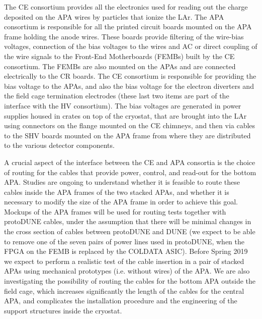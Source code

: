The CE consortium provides all the electronics used for reading out the charge
deposited on the APA wires by particles that ionize the LAr. The APA consortium
is responsible for all the printed circuit boards mounted on the APA frame
holding the anode wires. These boards provide filtering of the wire-bias voltages,
connection of the bias voltages to the wires and AC or direct coupling of the
wire signals to the Front-End Motherboards (FEMBs) built by the CE consortium.
The FEMBs are also mounted on the APAs and are connected electrically to the
CR boards. The CE consortium is responsible for providing the bias voltage to
the APAs, and also the bias voltage for the electron diverters and the field
cage termination electrodes (these last two items are part of the interface with
the HV consortium). The bias voltages are generated in power supplies housed
in crates on top of the cryostat, that are brought into the LAr using connectors
on the flange mounted on the CE chimneys, and then via cables to the SHV boards
mounted on the APA frame from where they are distributed to the various detector
components.

A crucial aspect of the interface between the CE and APA consortia
is the choice of routing for the cables that provide power, control, and read-out
for the bottom APA. Studies are ongoing to understand whether it is feasible to
route these cables inside the APA frames of the two stacked APAs, and whether it
is necessary to modify the size of the APA frame in order to achieve this goal.
Mockups of the APA frames will be used for routing tests together with protoDUNE
cables, under the assumption that there will be minimal changes in the cross
section of cables between protoDUNE and DUNE (we expect to be able to remove one
of the seven pairs of power lines used in protoDUNE, when the FPGA on the
FEMB is replaced by the COLDATA ASIC). Before Spring 2019 we expect to perform
a realistic test of the cable insertion in a pair of stacked APAs using
mechanical prototypes (i.e. without wires) of the APA. We are also investigating
the possibility of routing the cables for the bottom APA outside the field
cage, which increases significantly the length of the cables for the central
APA, and complicates the installation procedure and the engineering of the
support structures inside the cryostat.
